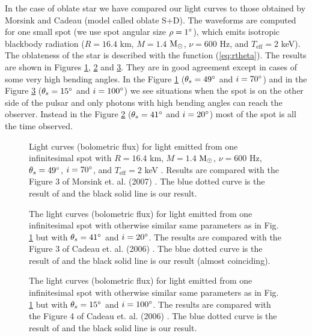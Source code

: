 \documentclass{wihuri}
\def\msun{{\rm M_{\odot}}}
\def\thetas{\theta_{s}}
\begin{document}
In the case of oblate star we have compared our light curves to those obtained by Morsink \cite{morsink} and Cadeau \cite{cadeau} (model called oblate S+D). The waveforms are computed for one small spot (we use spot angular size $\rho = 1 \degree$), which emits isotropic blackbody radiation ($R = 16.4$ km, $M = 1.4$ $\msun$, $\nu = 600$ Hz, and $T_{\mathrm{eff}} = 2$ keV). The oblateness of the star is described with the function (\ref{eq:rtheta}). The results are shown in Figures \ref{fig:mor3}, \ref{fig:cad3} and \ref{fig:cad4}. They are in good agreement except in cases of some very high bending angles. In the Figure \ref{fig:mor3} ($\thetas = 49 \degree$ and $i = 70 \degree$) and in the Figure \ref{fig:cad4} ($\thetas = 15 \degree$ and $i = 100 \degree$) we see situations when the spot is on the other side of the pulsar and only photons with high bending angles can reach the observer. Instead in the Figure \ref{fig:cad3} ($\thetas = 41 \degree$ and $i = 20 \degree$) most of the spot is all the time observed. 


\begin{figure}
\centerline{}
\caption{Light curves (bolometric flux) for light emitted from one infinitesimal spot with $R = 16.4$ km, $M = 1.4$ $\msun$, $\nu = 600$ Hz, $\thetas = 49 \degree$, $i = 70 \degree$, and $T_{\mathrm{eff}} = 2$ keV . Results are compared with the Figure 3 of Morsink et. al. (2007) \cite{morsink}. The blue dotted curve is the result of \cite{morsink} and the black solid line is our result.
\label{fig:mor3}}
\end{figure}


\begin{figure}
\centerline{}
\caption{The light curves (bolometric flux) for light emitted from one infinitesimal spot with otherwise similar same parameters as in Fig. \ref{fig:mor3} but with $\thetas = 41 \degree$ and $i = 20 \degree$. The results are compared with the Figure 3 of Cadeau et. al. (2006) \cite{cadeau}. The blue dotted curve is the result of \cite{cadeau} and the black solid line is our result (almost coinciding).
\label{fig:cad3}}
\end{figure}


\begin{figure}
\centerline{}
\caption{The light curves (bolometric flux) for light emitted from one infinitesimal spot with otherwise similar same parameters as in Fig. \ref{fig:mor3} but with $\thetas = 15 \degree$ and $i = 100 \degree$. The results are compared with the Figure 4 of Cadeau et. al. (2006) \cite{cadeau}. The blue dotted curve is the result of \cite{cadeau} and the black solid line is our result.
\label{fig:cad4}}
\end{figure}
\end{document}
